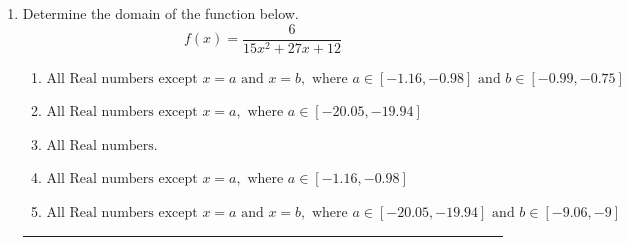 \documentclass[14pt]{extbook}
\newcommand{\litem}[1]{\item#1\hspace*{-1cm}\rule{\textwidth}{0.4pt}}
\begin{document}
\begin{enumerate}
\litem{
Determine the domain of the function below.\[ f(x) = \frac{6}{15x^{2} +27 x + 12} \]\begin{enumerate}[label=\Alph*.]
\item \( \text{All Real numbers except } x = a \text{ and } x = b, \text{ where } a \in [-1.16, -0.98] \text{ and } b \in [-0.99, -0.75] \)
\item \( \text{All Real numbers except } x = a, \text{ where } a \in [-20.05, -19.94] \)
\item \( \text{All Real numbers.} \)
\item \( \text{All Real numbers except } x = a, \text{ where } a \in [-1.16, -0.98] \)
\item \( \text{All Real numbers except } x = a \text{ and } x = b, \text{ where } a \in [-20.05, -19.94] \text{ and } b \in [-9.06, -9] \)


\end{enumerate}}
\end{enumerate}
\end{document}
